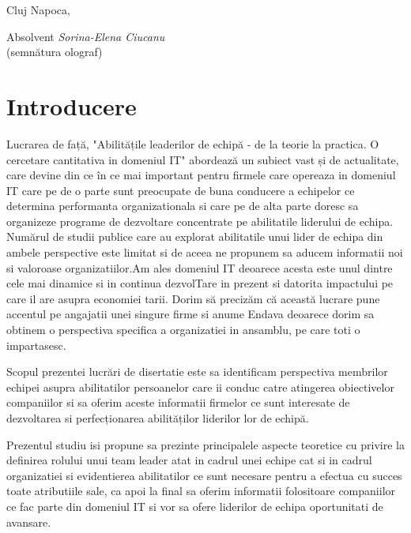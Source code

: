 \documentclass[a4paper, 12pt]{article}
\begin{document}
\vspace{3 cm}
\begin{flushleft}
	\large Cluj Napoca,
\end{flushleft}


\begin{flushright}
	\hfill \large Absolvent \textit{Sorina-Elena Ciucanu} \\
	\hfill \large {(semnătura olograf)}
\end{flushright}
\newpage
\thispagestyle{empty}
\tableofcontents
\thispagestyle{empty}
\newpage
\thispagestyle{empty}
\listoffigures
\newpage
\thispagestyle{empty}
\listoftables


\newpage


	\section*{Introducere}
	\quad\quad Lucrarea de față, "Abilitățile leaderilor de echipă - de la teorie la practica. O cercetare cantitativa  in domeniul IT" abordează un subiect vast și de actualitate, care devine din ce în ce mai important pentru firmele care  opereaza in domeniul IT care pe de o parte sunt preocupate de buna conducere a echipelor ce determina performanta organizationala si care pe de alta parte doresc sa organizeze programe de dezvoltare concentrate pe abilitatile liderului de echipa. Numărul de studii publice care au explorat abilitatile unui lider de echipa din ambele perspective este limitat si de aceea ne propunem sa aducem informatii noi si valoroase organizatiilor.Am ales domeniul IT deoarece  acesta este unul dintre cele mai dinamice si in continua dezvolTare  in prezent si datorita impactului pe care il are asupra economiei tarii.  Dorim să precizăm că această lucrare pune accentul pe angajatii unei singure firme si anume Endava deoarece dorim sa obtinem o perspectiva specifica a organizatiei in ansamblu, pe care toti o impartasesc.

	\quad Scopul prezentei lucrări de disertatie este sa identificam perspectiva membrilor echipei asupra abilitatilor persoanelor care ii conduc catre atingerea obiectivelor companiilor si sa oferim aceste informatii firmelor ce sunt interesate de dezvoltarea si perfecționarea abilităților liderilor lor de echipă.

	\quad Prezentul studiu isi propune sa prezinte principalele aspecte teoretice cu privire la definirea rolului unui team leader atat in cadrul unei echipe cat si in cadrul organizatiei si evidentierea abilitatilor ce sunt necesare pentru a efectua cu succes toate atributiile sale, ca apoi la final sa oferim informatii folositoare companiilor ce fac parte din domeniul IT si vor sa ofere liderilor de echipa oportunitati de avansare.
\end{document}
